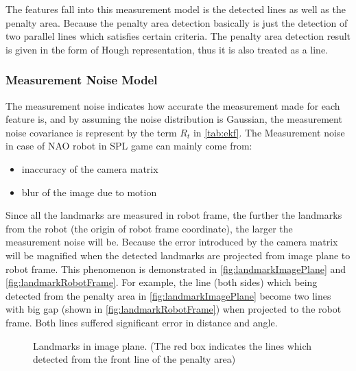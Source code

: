 The features fall into this measurement model is the detected lines as well as the penalty area. Because the penalty area detection basically is just the detection of two parallel lines which satisfies certain criteria. The penalty area detection result is given in the form of Hough representation, thus it is also treated as a line.

\subsubsection{Measurement Noise Model}
\label{sub:Measurement Noise Model}
The measurement noise indicates how accurate the measurement made for each feature is, and by assuming the noise distribution is Gaussian, the measurement noise covariance is represent by the term $R_{t}$ in \autoref{tab:ekf}. The Measurement noise in case of NAO robot in \gls{SPL} game can mainly come from:
\begin{itemize}
  \item inaccuracy of the camera matrix
  \item blur of the image due to motion
\end{itemize}
Since all the landmarks are measured in robot frame, the further the landmarks from the robot (the origin of robot frame coordinate), the larger the measurement noise will be. Because the error introduced by the camera matrix will be magnified when the detected landmarks are projected from image plane to robot frame. This phenomenon is demonstrated in \autoref{fig:landmarkImagePlane} and \autoref{fig:landmarkRobotFrame}. For example, the line (both sides) which being detected from the penalty area in \autoref{fig:landmarkImagePlane} become two lines with big gap (shown in \autoref{fig:landmarkRobotFrame}) when projected to the robot frame. Both lines suffered significant error in distance and angle.\\

\begin{figure}[h!]
  \centering
{}
  \caption{Landmarks in image plane. (The red box indicates the lines which detected from the front line of the penalty area)}
  \label{fig:landmarkImagePlane}
\end{figure}


